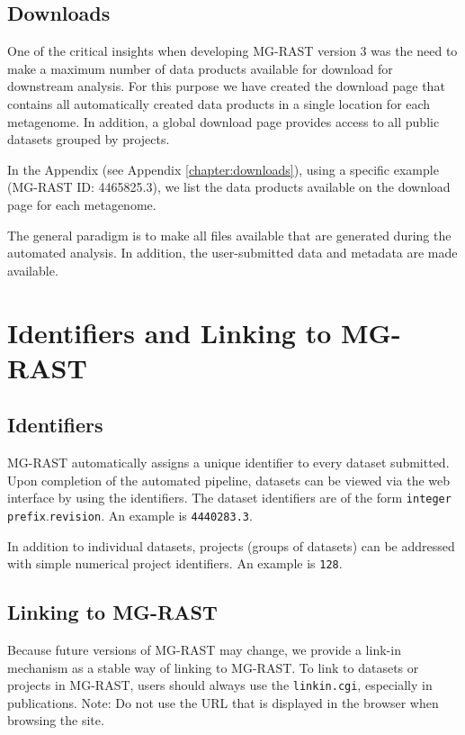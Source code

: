 \documentclass[12pt,fullpage]{report}
\begin{document}
\subsection{Downloads}
One of the critical insights when developing MG-RAST version 3 was the need to make a maximum number of data products available for download for downstream analysis. For this purpose we have created the download page that contains all automatically created data products in a single location for each metagenome. In addition, a global download page provides access to all public datasets grouped by projects.

In the Appendix (see Appendix \ref{chapter:downloads}),
using a specific example (MG-RAST ID: 4465825.3),
we list the data products available on the download page for each metagenome.

The general paradigm is to make all files available that are generated during the automated analysis. In addition, the user-submitted data and metadata are made available.
\section{Identifiers and Linking to MG-RAST}
\subsection{Identifiers}
\label{section:identifier}
MG-RAST automatically assigns a unique identifier to every dataset submitted. Upon completion of the automated pipeline, datasets can be viewed via the web interface by using the identifiers.
The dataset identifiers are of the form \texttt{integer prefix}.\texttt{revision}.
An example is \texttt{4440283.3}.

In addition to individual datasets, projects (groups of datasets) can be addressed with simple numerical project identifiers.
An example is \texttt{128}.
\subsection{Linking to MG-RAST}
\label{section:linkin}
Because future versions of MG-RAST may change, we provide a link-in mechanism as a stable way of linking to MG-RAST. To link to datasets or projects in MG-RAST, users should always use the \texttt{linkin.cgi}, especially in publications.
Note: Do not use the URL that is displayed in the browser when browsing the site.
\end{document}
